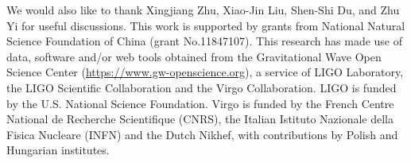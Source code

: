 \documentclass[twocolumn]{aastex631}
\begin{document}
\begin{acknowledgments}
We would also like to thank Xingjiang Zhu, Xiao-Jin Liu, Shen-Shi Du, and Zhu Yi for useful discussions.
This work is supported by grants from National Natural Science Foundation of China (grant No.11847107). 
This research has made use of data, software and/or web tools obtained 
from the Gravitational Wave Open Science Center \cite{Vallisneri:2014vxa}
(\url{https://www.gw-openscience.org}), a service of LIGO Laboratory, 
the LIGO Scientific Collaboration and the Virgo Collaboration. 
LIGO is funded by the U.S. National Science Foundation. 
Virgo is funded by the French Centre National de Recherche Scientifique (CNRS),
the Italian Istituto Nazionale della Fisica Nucleare (INFN) and the Dutch Nikhef,
with contributions by Polish and Hungarian institutes. 
\end{acknowledgments}	
	

\end{document}
